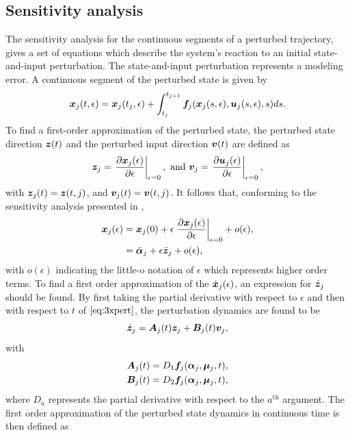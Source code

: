 \documentclass[../DC2017114Bouma.tex]{subfiles}
\begin{document}
\subsection{Sensitivity analysis}
The sensitivity analysis for the continuous segments of a perturbed trajectory, gives a set of equations which describe the system's reaction to an initial state-and-input perturbation. The state-and-input perturbation represents a modeling error. A continuous segment of the perturbed state is given by
\begin{align}
{\boldsymbol{x}}_j(t,\epsilon) = {\boldsymbol{x}}_j(t_j,\epsilon) + \int_{t_j}^{t_{j+1}}{\boldsymbol{f}}_j({\boldsymbol{x}}_j(s,\epsilon),{\boldsymbol{u}}_j(s,\epsilon),s)ds.\label{eq:3xpert}
\end{align}
To find a first-order approximation of the perturbed state, the perturbed state direction ${\boldsymbol{z}}(t)$ and the perturbed input direction ${\boldsymbol{v}}(t)$ are defined as
\begin{align}
{\boldsymbol{z}}_j = \left.\frac{\partial{\boldsymbol{x}}_j(\epsilon)}{\partial\epsilon}\right|_{\epsilon=0},\text{ and } {\boldsymbol{v}}_j = \left.\frac{\partial{\boldsymbol{u}}_j(\epsilon)}{\partial\epsilon}\right|_{\epsilon=0},
\end{align}
with ${\boldsymbol{z}}_j(t) = {\boldsymbol{z}}(t,j)$, and ${\boldsymbol{v}}_j(t) = {\boldsymbol{v}}(t,j)$. It follows that, conforming to the sensitivity analysis presented in \cite{Khalil1996},
\begin{align}
{\boldsymbol{x}}_j(\epsilon) &= {\boldsymbol{x}}_j(0) + \epsilon\left.\frac{\partial{\boldsymbol{x}}_j(\epsilon)}{\partial\epsilon}\right|_{\epsilon=0} + o(\epsilon),\label{eq:3taylor}\\
&= \bar{\boldsymbol{\alpha}}_j + \epsilon\bar{{\boldsymbol{z}}}_j + o(\epsilon),
\end{align}
with $o(\epsilon)$ indicating the little-o notation of $\epsilon$ which represents higher order terms. To find a first order approximation of the $\dot{{\boldsymbol{x}}}_j(\epsilon)$, an expression for $\dot{{\boldsymbol{z}}}_j$ should be found. By first taking the partial derivative with respect to $\epsilon$ and then with respect to $t$ of $\eqref{eq:3xpert}$, the perturbation dynamics are found to be
\begin{align}
\dot{{\boldsymbol{z}}}_j = {\boldsymbol{A}}_j(t){\boldsymbol{z}}_j +{\boldsymbol{B}}_j(t){\boldsymbol{v}}_j,\label{eq:3zdot}
\end{align}
with
\begin{align}
{\boldsymbol{A}}_j(t) &= D_1{\boldsymbol{f}}_j(\boldsymbol{\alpha}_j,\boldsymbol{\mu}_j,t),\\
{\boldsymbol{B}}_j(t) &= D_2{\boldsymbol{f}}_j(\boldsymbol{\alpha}_j,\boldsymbol{\mu}_j,t),
\end{align}
where $D_a$ represents the partial derivative with respect to the $a^{\text{th}}$ argument. The first order approximation of the perturbed state dynamics in continuous time is then defined as
\end{document}
